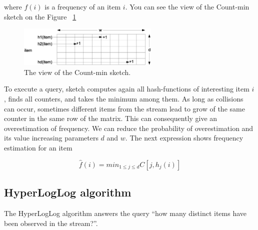 where $f(i)$ is a frequency of an item $i$.
You can see the view of the Count-min sketch on the Figure ~\ref{fig:count_min_sketch}

\begin{figure}[h]
  \centering
  \includegraphics [width=0.6\textwidth]{images/CountMinSketch}
  \caption{The view of the Count-min sketch.}
  \label{fig:count_min_sketch}
\end{figure}

To execute a query, sketch computes again all hash-functions of interesting item $i$, finds all counters, and takes the minimum among them.
As long as collisions can occur, sometimes different items from the stream lead to grow of the same counter in the same row of the matrix.
This can consequently give an overestimation of frequency.
We can reduce the probability of overestimation and its value increasing parameters $d$ and $w$.
The next expression shows frequency estimation for an item

$$
\hat{f}(i) = min_{1 \leq j \leq d}C[j,h_j(i)]
$$

\subsection{HyperLogLog algorithm}

The HyperLogLog algorithm answers the query ``how many distinct items have been observed in the stream?''.
\cite{Heule2013, Flajolet2007}


